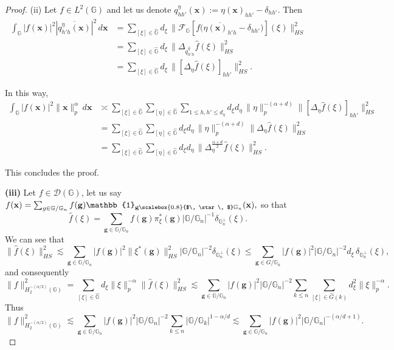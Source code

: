 \documentclass[12pt, reqno]{amsart}
\newcommand{\1}{\mathds{1}}
\newcommand{\G}{\mathbb{G}}
\newcommand{\smallstar}{\scalebox{0.8}{$\, \star \, $}}
\begin{document}
\begin{proof}
\noindent (ii) Let $f \in L^2(\mathbb{G})$ and let us denote $q^\eta_{hh'}(\mathbf{x}) := \eta (\mathbf{x})_{hh'} - \delta_{hh'} .$ Then
\begin{align*}
\int_{\mathbb{G}} |f(\mathbf{x})|^2 |\overline{q^\eta_{h'h}(\mathbf{x})}|^2 \, d\mathbf{x}
&= \sum_{[\xi] \in \widehat{\mathbb{G}}} 
d_\xi  \, \| \mathcal{F}_{\G} [ f\big( \overline{\eta(\mathbf{x})_{h'h}} - \delta_{hh'} \big)](\xi)\|_{HS}^2 \\
&= \sum_{[\xi] \in \widehat{\mathbb{G}}} 
d_\xi  \, \|\Delta_{\overline{q^\eta_{h'h}}} \hat{f}(\xi)\|_{HS}^2 \\
&= \sum_{[\xi] \in \widehat{\mathbb{G}}} 
d_\xi \, \| [\Delta_\eta \hat{f}(\xi)]_{hh'}\|_{HS}^2 .
\end{align*}

In this way,
\begin{align*}
\int_{\mathbb{G}} |f(\mathbf{x})|^2 \|\mathbf{x}\|_p^{\alpha} \, d\mathbf{x}
&\asymp \sum_{[\xi] \in \widehat{\mathbb{G}}} \sum_{[\eta] \in \widehat{\mathbb{G}}}
\sum_{1 \leq  h,h' \leq d_\eta}
d_\xi  d_\eta \, \|\eta\|_p^{-(\alpha+d)} 
\| [\Delta_\eta \hat{f}(\xi)]_{hh'} \|_{HS}^2 \\
&= \sum_{[\xi] \in \widehat{\mathbb{G}}} \sum_{[\eta] \in \widehat{\mathbb{G}}}
d_\xi d_\eta  \, \|\eta\|_p^{-(\alpha+d)} 
\|\Delta_\eta \hat{f}(\xi)\|_{HS}^2 \\
&= \sum_{[\xi] \in \widehat{\mathbb{G}}} \sum_{[\eta] \in \widehat{\mathbb{G}}}
d_\xi d_\eta\, 
\|\Delta^{\frac{\alpha+d}{2}}_\eta \hat{f}(\xi)\|_{HS}^2 .
\end{align*}

This concludes the proof.

\textbf{(iii)} Let $f \in \mathcal{D}(\mathbb{G})$, let us say $f(\mathbf{x}) = \sum_{g \in \mathbb{G} / \mathbb{G}_n} f(\mathbf{g}) \mathbb{1}_{\mathbf{g} \smallstar \mathbb{G}_n}(\mathbf{x}),$ so that
\[
\widehat{f}(\xi) = \sum_{\mathbf{g} \in \mathbb{G} / \mathbb{G}_n} f(\mathbf{g}) \pi^*_\xi(\mathbf{g}) |\mathbb{G} / \mathbb{G}_n|^{-1} \delta_{\mathbb{G}_n^\perp}(\xi).
\]
We can see that
\[
\|\widehat{f}(\xi)\|^2_{HS} \lesssim \sum_{\mathbf{g} \in \mathbb{G} / \mathbb{G}_n} |f(\mathbf{g})|^2 \|\xi^*(\mathbf{g})\|^2_{HS} |\mathbb{G} / \mathbb{G}_n|^{-2} \delta_{\mathbb{G}_n^\perp}(\xi)
\leq \sum_{\mathbf{g} \in G / \mathbb{G}_n} |f(\mathbf{g})|^2 |\mathbb{G} / \mathbb{G}_n|^{-2} d_\xi \, \delta_{\mathbb{G}_n^\perp}(\xi),
\]
and consequently
\[
\|f\|^2_{H^{-(\alpha/2)}_2(\mathbb{G})} 
= \sum_{[\xi] \in \widehat{\mathbb{G}}} d_\xi \|\xi\|^{-\alpha}_p \|\widehat{f}(\xi)\|^2_{HS}
\lesssim \sum_{\mathbf{g} \in \mathbb{G} / \mathbb{G}_n} |f(\mathbf{g})|^2 |\mathbb{G} / \mathbb{G}_n|^{-2}
\sum_{k \leq n} \sum_{[\xi] \in \widehat{G}(k)} d_\xi^2 \|\xi\|^{-\alpha}_p.
\]
Thus
\[
\|f\|^2_{H^{-(\alpha/2)}_2(\mathbb{G})} \lesssim 
\sum_{\mathbf{g} \in \mathbb{G} / \mathbb{G}_n} |f(\mathbf{g})|^2 |\mathbb{G} / \mathbb{G}_n|^{-2} 
\sum_{k \leq n} |\mathbb{G} / \G_k|^{1-\alpha/d}
\lesssim \sum_{\mathbf{g} \in \mathbb{G} / \mathbb{G}_n} |f(\mathbf{g})|^2 |\mathbb{G} / \mathbb{G}_n|^{-(\alpha/d+1)}.
\]


\end{proof}
\end{document}
